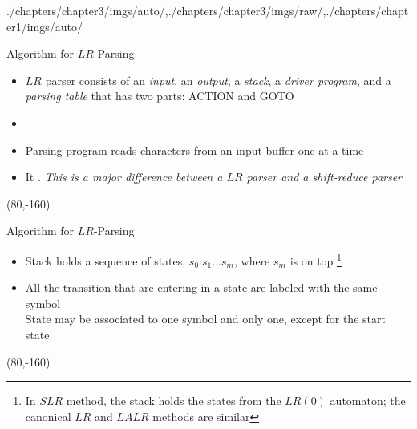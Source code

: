 \begin{graphicspathcontext}{{./chapters/chapter3/imgs/auto/},{./chapters/chapter3/imgs/raw/},{./chapters/chapter1/imgs/auto/}}
\begin{bibunit}[apalike]
\begin{frame}[t]{Algorithm for $LR$-Parsing }
	\begin{itemize}
	\item $LR$ parser consists of an \emph{input}, an \emph{output}, a \emph{stack}, a \emph{driver program}, and a \emph{parsing table} that has two parts: ACTION and GOTO
	\item {}
	\vspace{.25cm}
	\item Parsing program reads characters from an input buffer one at a time
	\item It . \emph{This is a major difference between a $LR$ parser and a shift-reduce parser}
	\end{itemize}
	\putat*(80,-160){}
\end{frame}

\begin{frame}[t]{Algorithm for $LR$-Parsing }
	\begin{small}
	\begin{itemize}
	\item Stack holds a sequence of states, $s_0\;s_1 \dots s_m$, where $s_m$ is on top \footnote{In $SLR$ method, the stack holds the states from the $LR(0)$ automaton; the canonical $LR$ and $LALR$ methods are similar} 
	\item All the transition that are entering in a state are labeled with the same symbol \\
	State may be associated to one symbol and only one, except for the start state
	\end{itemize}
	\end{small}
	\putat*(80,-160){}
\end{frame}


\end{bibunit}
\end{graphicspathcontext}
